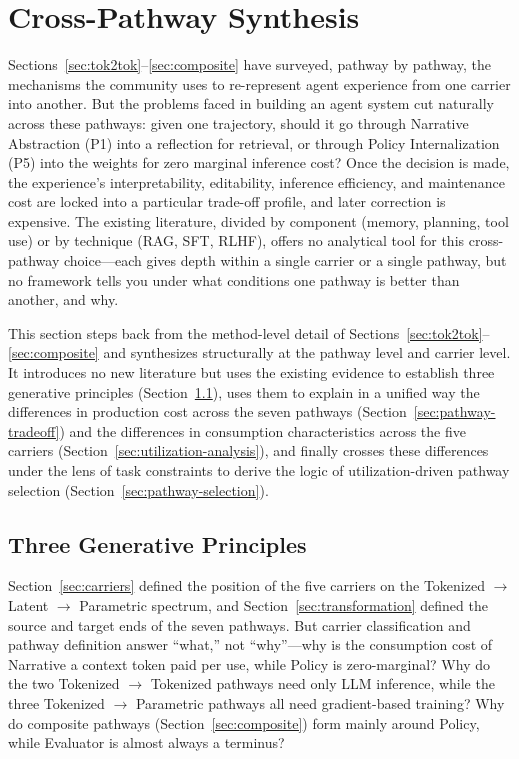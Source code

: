 \section{Cross-Pathway Synthesis}
\label{sec:synthesis}

Sections~\ref{sec:tok2tok}--\ref{sec:composite} have surveyed, pathway by pathway, the mechanisms the community uses to re-represent agent experience from one carrier into another. But the problems faced in building an agent system cut naturally across these pathways: given one trajectory, should it go through Narrative Abstraction (P1) into a reflection for retrieval, or through Policy Internalization (P5) into the weights for zero marginal inference cost? Once the decision is made, the experience's interpretability, editability, inference efficiency, and maintenance cost are locked into a particular trade-off profile, and later correction is expensive. The existing literature, divided by component (memory, planning, tool use) or by technique (RAG, SFT, RLHF), offers no analytical tool for this cross-pathway choice---each gives depth within a single carrier or a single pathway, but no framework tells you under what conditions one pathway is better than another, and why.

This section steps back from the method-level detail of Sections~\ref{sec:tok2tok}--\ref{sec:composite} and synthesizes structurally at the pathway level and carrier level. It introduces no new literature but uses the existing evidence to establish three generative principles (Section~\ref{sec:principles}), uses them to explain in a unified way the differences in production cost across the seven pathways (Section~\ref{sec:pathway-tradeoff}) and the differences in consumption characteristics across the five carriers (Section~\ref{sec:utilization-analysis}), and finally crosses these differences under the lens of task constraints to derive the logic of utilization-driven pathway selection (Section~\ref{sec:pathway-selection}).

\subsection{Three Generative Principles}
\label{sec:principles}

Section~\ref{sec:carriers} defined the position of the five carriers on the Tokenized $\rightarrow$ Latent $\rightarrow$ Parametric spectrum, and Section~\ref{sec:transformation} defined the source and target ends of the seven pathways. But carrier classification and pathway definition answer ``what,'' not ``why''---why is the consumption cost of Narrative a context token paid per use, while Policy is zero-marginal? Why do the two Tokenized $\rightarrow$ Tokenized pathways need only LLM inference, while the three Tokenized $\rightarrow$ Parametric pathways all need gradient-based training? Why do composite pathways (Section~\ref{sec:composite}) form mainly around Policy, while Evaluator is almost always a terminus?

